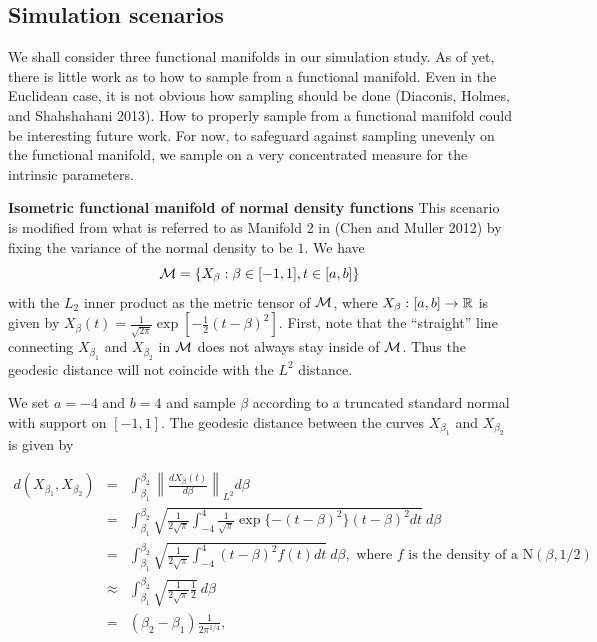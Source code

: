 \subsection{Simulation scenarios}\label{simulation-scenarios}

We shall consider three functional manifolds in our simulation study. As
of yet, there is little work as to how to sample from a functional
manifold. Even in the Euclidean case, it is not obvious how sampling
should be done (Diaconis, Holmes, and Shahshahani 2013). How to properly
sample from a functional manifold could be interesting future work. For
now, to safeguard against sampling unevenly on the functional manifold,
we sample on a very concentrated measure for the intrinsic parameters.

\textbf{Isometric functional manifold of normal density functions} This
scenario is modified from what is referred to as Manifold 2 in (Chen and
Muller 2012) by fixing the variance of the normal density to be \(1\).
We have
\[\mathcal{M} =  \left \{X_\beta: \beta \in [-1,1], t \in [a,b]\right \}\] with
the \(L_2\) inner product as the metric tensor of \(\mathcal{M}\), where
\(X_\beta: [a,b] \to \mathbb{R}\) is given by
\(X_\beta(t) = \frac{1}{\sqrt{2\pi}} \exp{[-\frac{1}{2}(t-\beta)^2]}\).
First, note that the ``straight'' line connecting \(X_{\beta_1}\) and
\(X_{\beta_2}\) in \(\mathcal{M}\) does not always stay inside of \(\mathcal{M}\). Thus
the geodesic distance will not coincide with the \(L^2\) distance.

We set \(a=-4\) and \(b=4\) and sample \(\beta\) according to a
truncated standard normal with support on \([-1,1]\). The geodesic
distance between the curves \(X_{\beta_1}\) and \(X_{\beta_2}\) is given
by

\begin{eqnarray*}
d(X_{\beta_1},X_{\beta_2}) &=& \int_{\beta_1}^{\beta_2} \left \| \frac{d X_\beta (t)}{d\beta} \right\|_{L^2} d\beta \\
&=&  \int_{\beta_1}^{\beta_2} \sqrt{ \frac{1}{2\sqrt{\pi}} \int_{-4}^4 \frac{1}{\sqrt{\pi}} \exp\{-(t-\beta)^2\}(t-\beta)^2 dt  }  \  d\beta \\
&=&   \int_{\beta_1}^{\beta_2} \sqrt{ \frac{1}{2\sqrt{\pi}} \int_{-4}^4(t-\beta)^2 f(t) dt  }  \  d\beta, \textrm{ where $f$ is the density of a N$(\beta,1/2)$ }   \\
&\approx&  \int_{\beta_1}^{\beta_2}  \sqrt{ \frac{1}{2\sqrt{\pi}} \frac{1}{2}} \ d\beta \\
&=& (\beta_2-\beta_1) \frac{1}{2\pi^{1/4}},
\end{eqnarray*}

